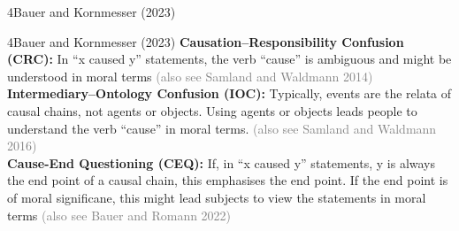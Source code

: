 \documentclass[xcolor=table,9pt,aspectratio=169]{beamer}
\begin{document}
\begin{frame}
\begin{overlayarea}{\textwidth}{0.81\paperheight}{
   \vspace*{11mm}
   \textcolor{uolblue}
   {4\hspace*{1em}Bauer and Kornmesser (2023)}
}
\end{overlayarea}
\end{frame}


\begin{frame}{\vspace*{10mm}4\hspace*{1em}Bauer and Kornmesser (2023)}
\vspace*{-5mm}
\textbf{Causation--Responsibility Confusion (CRC):} In ``x caused y'' statements, the verb ``cause'' is ambiguous and might be understood in moral terms \textcolor{gray}{(also see Samland and Waldmann 2014)}\\
\vspace*{1em}
\textbf{Intermediary--Ontology Confusion (IOC):} Typically, events are the relata of causal chains, not agents or objects. Using agents or objects leads people to understand the verb ``cause'' in moral terms. \textcolor{gray}{(also see Samland and Waldmann 2016)}\\
\vspace*{1em}
\textbf{Cause-End Questioning (CEQ):} If, in ``x caused y'' statements, y is always the end point of a causal chain, this emphasises the end point. If the end point is of moral significane, this might lead subjects to view the statements in moral terms \textcolor{gray}{(also see Bauer and Romann 2022)}\\
\vfill
{}
\end{frame}
\end{document}
